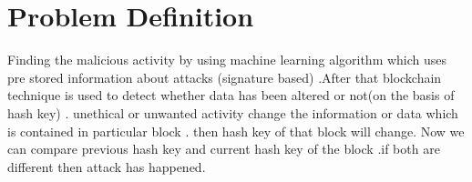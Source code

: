 \chapter{Problem Definition}

Finding the malicious activity by using machine learning algorithm which uses pre stored information about attacks (signature based) .After that blockchain technique is used to detect whether data has been altered or not(on the basis of hash key) . unethical or unwanted activity change the information or data which is contained in particular block . then hash key of that block will change. Now we can compare previous hash key and current hash key of the block .if both are different then attack has happened.